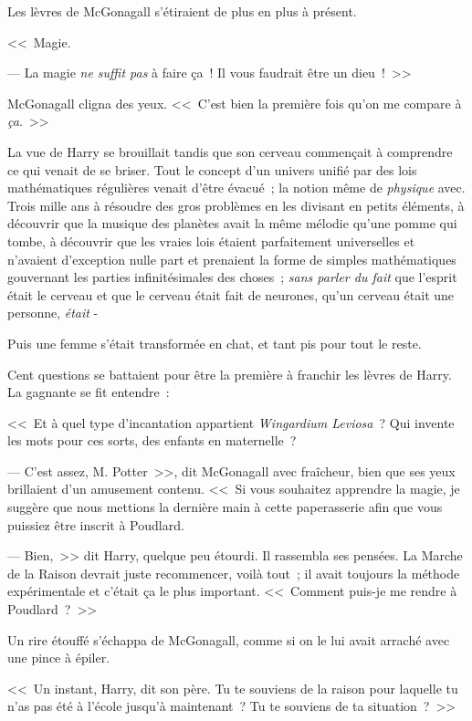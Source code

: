 Les lèvres de McGonagall s'étiraient de plus en plus à présent.

<<~Magie.

--- La magie \emph{ne suffit pas} à faire ça~! Il vous faudrait être un dieu~!~>>

McGonagall cligna des yeux. <<~C'est bien la première fois qu'on me compare à \emph{ça}.~>>

La vue de Harry se brouillait tandis que son cerveau commençait à comprendre ce qui venait de se briser. Tout le concept d'un univers unifié par des lois mathématiques régulières venait d'être évacué~; la notion même de \emph{physique} avec. Trois mille ans à résoudre des gros problèmes en les divisant en petits éléments, à découvrir que la musique des planètes avait la même mélodie qu'une pomme qui tombe, à découvrir que les vraies lois étaient parfaitement universelles et n'avaient d'exception nulle part et prenaient la forme de simples mathématiques gouvernant les parties infinitésimales des choses~; \emph{sans parler du fait} que l'esprit était le cerveau et que le cerveau était fait de neurones, qu'un cerveau était une personne, \emph{était} -

Puis une femme s'était transformée en chat, et tant pis pour tout le reste.

Cent questions se battaient pour être la première à franchir les lèvres de Harry. La gagnante se fit entendre~:

<<~Et à quel type d'incantation appartient \emph{Wingardium Leviosa}~? Qui invente les mots pour ces sorts, des enfants en maternelle~?

--- C'est assez, M. Potter~>>, dit McGonagall avec fraîcheur, bien que ses yeux brillaient d'un amusement contenu. <<~Si vous souhaitez apprendre la magie, je suggère que nous mettions la dernière main à cette paperasserie afin que vous puissiez être inscrit à Poudlard.

--- Bien,~>> dit Harry, quelque peu étourdi. Il rassembla ses pensées. La Marche de la Raison devrait juste recommencer, voilà tout~; il avait toujours la méthode expérimentale et c'était ça le plus important. <<~Comment puis-je me rendre à Poudlard~?~>>

Un rire étouffé s'échappa de McGonagall, comme si on le lui avait arraché avec une pince à épiler.

<<~Un instant, Harry, dit son père. Tu te souviens de la raison pour laquelle tu n'as pas été à l'école jusqu'à maintenant~? Tu te souviens de ta situation~?~>>

